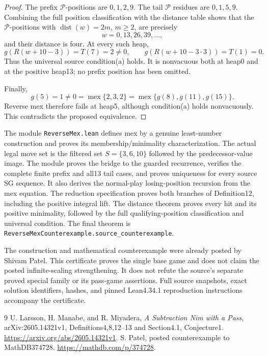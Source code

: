 \documentclass[11pt]{article}
\newcommand{\mex}{\operatorname{mex}}
\newcommand{\dist}{\operatorname{dist}}
\begin{document}
\begin{proof}
The prefix $\mathcal P$-positions are $0,1,2,9$. The tail $\mathcal P$ residues are $0,1,5,9$. Combining the full position classification with the distance table shows that the $\mathcal P$-positions with $\dist(w)=2m$, $m\ge2$, are precisely
\[
 w=0,13,26,39,\ldots,
\]
and their distance is four. At every such heap,
\[
 g(R(w+10-3))=T(7)=2\ne0,\qquad
 g(R(w+10-3\cdot3))=T(1)=0.
\]
Thus the universal source condition(a) holds. It is nonvacuous both at heap0 and at the positive heap13; no prefix position has been omitted.

Finally,
\[
 g(5)=1\ne0=\mex\{2,3,2\}
   =\mex\{g(8),g(11),g(15)\}.
\]
Reverse mex therefore fails at heap5, although condition(a) holds nonvacuously. This contradicts the proposed equivalence.
\end{proof}
The module \texttt{ReverseMex.lean} defines mex by a genuine least-number construction and proves its membership/minimality characterization. The actual legal move set is the filtered set $S=\{3,6,10\}$ followed by the predecessor-value image. The module proves the bridge to the guarded recurrence, verifies the complete finite prefix and all13 tail cases, and proves uniqueness for every source SG sequence. It also derives the normal-play losing-position recursion from the mex equation. The reduction specification proves both branches of Definition12, including the positive integral lift. The distance theorem proves every hit and its positive minimality, followed by the full qualifying-position classification and universal condition. The final theorem is \texttt{ReverseMexCounterexample.source\_counterexample}.

The construction and mathematical counterexample were already posted by Shivam Patel. This certificate proves the single base game and does not claim the posted infinite-scaling strengthening. It does not refute the source's separate proved special family or its pass-game assertions. Full source snapshots, exact solution identifiers, hashes, and pinned Lean4.34.1 reproduction instructions accompany the certificate.
\begin{thebibliography}{9}
 U. Larsson, H. Manabe, and R. Miyadera, \emph{A Subtraction Nim with a Pass}, arXiv:2605.14321v1, Definitions4,8,12--13 and Section4.1, Conjecture1. \url{https://arxiv.org/abs/2605.14321v1}.
 S. Patel, posted counterexample to MathDB374728. \url{https://mathdb.com/p/374728}.
\end{thebibliography}
\end{document}
